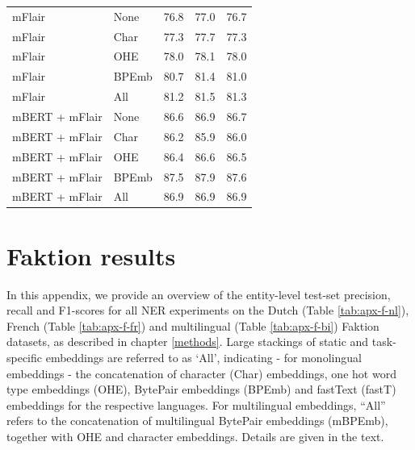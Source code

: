 \documentclass[12pt,a4paper,]{book}
\begin{document}
\begin{longtable}[t]{llrrr}
\hspace{1em}mFlair & None & 76.8 & 77.0 & 76.7\\
\hspace{1em}mFlair & Char & 77.3 & 77.7 & 77.3\\
\hspace{1em}mFlair & OHE & 78.0 & 78.1 & 78.0\\
\hspace{1em}mFlair & BPEmb & 80.7 & 81.4 & 81.0\\
\hspace{1em}mFlair & All & 81.2 & 81.5 & 81.3\\
\hspace{1em}mBERT + mFlair & None & 86.6 & 86.9 & 86.7\\
\hspace{1em}mBERT + mFlair & Char & 86.2 & 85.9 & 86.0\\
\hspace{1em}mBERT + mFlair & OHE & 86.4 & 86.6 & 86.5\\
\hspace{1em}mBERT + mFlair & BPEmb & 87.5 & 87.9 & 87.6\\
\hspace{1em}mBERT + mFlair & All & 86.9 & 86.9 & 86.9\\*
\end{longtable}
\endgroup{}

\hypertarget{faktion-results}{%
\chapter{Faktion results}\label{faktion-results}}

In this appendix, we provide an overview of the entity-level test-set precision, recall and F1-scores for all NER experiments on the Dutch (Table \ref{tab:apx-f-nl}), French (Table \ref{tab:apx-f-fr}) and multilingual (Table \ref{tab:apx-f-bi}) Faktion datasets, as described in chapter \ref{methods}. Large stackings of static and task-specific embeddings are referred to as `All', indicating - for monolingual embeddings - the concatenation of character (Char) embeddings, one hot word type embeddings (OHE), BytePair embeddings (BPEmb) and fastText (fastT) embeddings for the respective languages. For multilingual embeddings, ``All'' refers to the concatenation of multilingual BytePair embeddings (mBPEmb), together with OHE and character embeddings. Details are given in the text.

\begingroup\fontsize{10}{12}\selectfont
\end{document}
